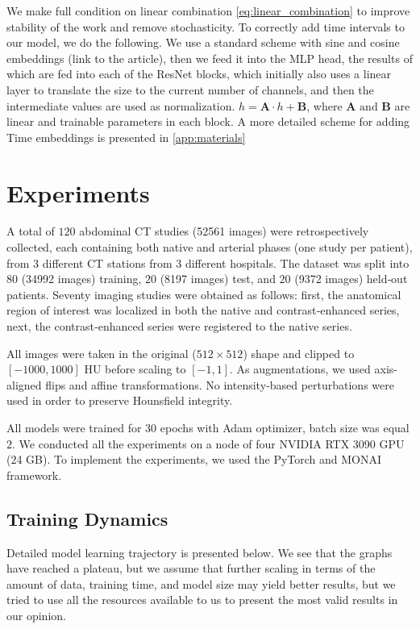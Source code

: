 \documentclass{article}
\begin{document}
We make full condition on linear combination \eqref{eq:linear_combination} to improve stability of the work and remove stochasticity. To correctly add time intervals to our model, we do the following. We use a standard scheme with sine and cosine embeddings (link to the article), then we feed it into the MLP head, the results of which are fed into each of the ResNet blocks, which initially also uses a linear layer to translate the size to the current number of channels, and then the intermediate values are used as normalization. $h = \textbf{A} \cdot h + \textbf{B}$, where $\textbf{A} \text{ and } \textbf{B}$ are linear and trainable parameters in each block. A more detailed scheme for adding Time embeddings is presented in \ref{app:materials}

\section{Experiments}
A total of $120$ abdominal CT studies (52561 images) were retrospectively collected, each containing both native and arterial phases (one study per patient), from 3 different CT stations from 3 different hospitals. The dataset was split into $80$ (34992 images) training, $20$ (8197 images) test, and $20$ (9372 images) held‑out patients. Seventy imaging studies were obtained as follows: first, the anatomical region of interest was localized in both the native and contrast‐enhanced series, next, the contrast‐enhanced series were registered to the native series.

All images were taken in the original ($512{\times}512$) shape and clipped to  $[-1000,1000]$ HU before scaling to $[-1, 1]$. As augmentations, we used axis-aligned flips and affine transformations. No intensity‑based perturbations were used in order to preserve Hounsfield integrity.

All models were trained for $30$ epochs with Adam optimizer, batch size was equal $2$. We conducted all the experiments on a node of four NVIDIA RTX 3090 GPU (24 GB). To implement the experiments, we used the PyTorch \citep{paszke2019pytorch} and MONAI framework. 

\subsection{Training Dynamics}
Detailed model learning trajectory is presented below. We see that the graphs have reached a plateau, but we assume that further scaling in terms of the amount of data, training time, and model size may yield better results, but we tried to use all the resources available to us to present the most valid results in our opinion.
\end{document}
